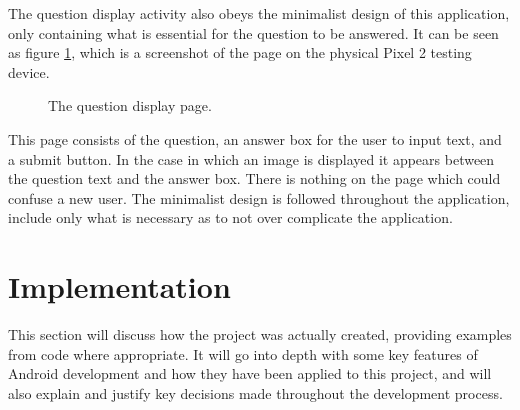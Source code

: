 \documentclass{article}
\begin{document}
The question display activity also obeys the minimalist design of this application, only containing what is essential for the question to be answered. It can be seen as figure \ref{figure:applicationQuestionPage}, which is a screenshot of the page on the physical Pixel 2 testing device.

\begin{figure}[H]
	\centering
	\caption{The question display page.}
	\label{figure:applicationQuestionPage}
\end{figure}

This page consists of the question, an answer box for the user to input text, and a submit button. In the case in which an image is displayed it appears between the question text and the answer box. There is nothing on the page which could confuse a new user. The minimalist design is followed throughout the application, include only what is necessary as to not over complicate the application. \par

\section{Implementation}
\label{section:implementation}

This section will discuss how the project was actually created, providing examples from code where appropriate. It will go into depth with some key features of Android development and how they have been applied to this project, and will also explain and justify key decisions made throughout the development process. 
\end{document}
